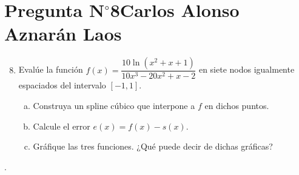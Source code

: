 \section{Pregunta N$^{\circ}$8\qquad Carlos Alonso Aznarán Laos}

\begin{frame}
    \begin{enumerate}\setcounter{enumi}{7}
        \item

              Evalúe la función
              \begin{math}
                  f\left(x\right)=
                  \dfrac{
                  10\ln\left(x^{2}+x+1\right)
                  }{
                  10x^{3}-20x^{2}+x-2
                  }
              \end{math}
              en siete nodos igualmente espaciados del intervalo
              $\left[-1,1\right]$.

              \begin{enumerate}[a)]
                  \item

                        Construya un spline cúbico que interpone a
                        $f$ en dichos puntos.

                  \item

                        Calcule el error
                        \begin{math}
                            e\left(x\right)=
                            f\left(x\right)-
                            s\left(x\right)
                        \end{math}.

                  \item

                        Gráfique las tres funciones.
                        ¿Qué puede decir de dichas gráficas?
              \end{enumerate}
    \end{enumerate}

    \begin{solution}
        .
    \end{solution}
\end{frame}

